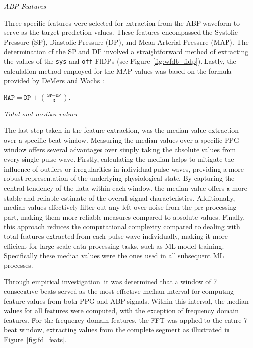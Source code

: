 \vspace{0.2cm}
\textit{ABP Features}
\vspace{0.2cm}

Three specific features were selected for extraction from the ABP waveform to serve as the target prediction values.
These features encompassed the Systolic Pressure (SP), Diastolic Pressure (DP), and Mean Arterial Pressure (MAP).
The determination of the SP and DP involved a straightforward method of extracting the values of the \texttt{sys} and \texttt{off} FIDPs (see Figure~\ref{fig:wfdb_fidp}).
Lastly, the calculation method employed for the MAP values was based on the formula provided by DeMers and Wachs~\cite{demersPhysiologyMeanArterial2024}:

\vspace{0.1cm}
\large
\begin{center}
    \begin{math}
        \texttt{MAP} = \texttt{DP} + \left(\frac{\texttt{SP} - \texttt{DP}}{3}\right).
    \end{math}
\end{center}
\normalsize

\vspace{0.2cm}
\textit{Total and median values}
\vspace{0.2cm}

The last step taken in the feature extraction, was the median value extraction over a specific beat window.
Measuring the median values over a specific PPG window offers several advantages over simply taking the absolute values from every single pulse wave.
Firstly, calculating the median helps to mitigate the influence of outliers or irregularities in individual pulse waves, providing a more robust representation of the underlying physiological state.
By capturing the central tendency of the data within each window, the median value offers a more stable and reliable estimate of the overall signal characteristics.
Additionally, median values effectively filter out any left-over noise from the pre-processing part, making them more reliable measures compared to absolute values.
Finally, this approach reduces the computational complexity compared to dealing with total features extracted from each pulse wave individually, making it more efficient for large-scale data processing tasks, such as ML model training.
Specifically these median values were the ones used in all subsequent ML processes.

Through empirical investigation, it was determined that a window of 7 consecutive beats served as the most effective median interval
for computing feature values from both PPG and ABP signals.
Within this interval, the median values for all features were computed, with the exception of frequency domain features.
For the frequency domain features, the FFT was applied to the entire 7-beat window, extracting values from the complete segment as illustrated in Figure~\ref{fig:fd_feats}.

